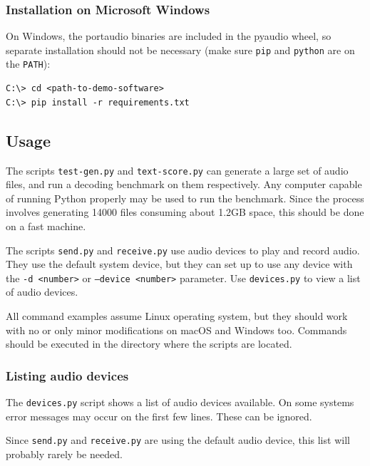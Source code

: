 \documentclass[a4paper]{article}
\begin{document}
\subsubsection{Installation on Microsoft Windows}

On Windows, the portaudio binaries are included in the pyaudio wheel, 
so separate installation should not be necessary (make sure 
\texttt{pip} and \texttt{python} are on the \texttt{PATH}):

\begin{lstlisting}
C:\> cd <path-to-demo-software>
C:\> pip install -r requirements.txt
\end{lstlisting}

\subsection{Usage}

The scripts \texttt{test-gen.py} and \texttt{text-score.py} can 
generate a large set of audio files, and run a decoding benchmark on 
them respectively. Any computer capable of running Python properly may 
be used to run the benchmark. Since the process involves generating
14000 files consuming about 1.2GB space, this should be done on a fast
machine.

The scripts \texttt{send.py} and \texttt{receive.py} use audio devices 
to play and record audio. They use the default system device, but they 
can set up to use any device with the \texttt{-d <number>} or 
\texttt{--device <number>} parameter. Use \texttt{devices.py} to view a 
list of audio devices.

All command examples assume Linux operating system, but they should 
work with no or only minor modifications on macOS and Windows too. 
Commands should be executed in the directory where the scripts are 
located.

\subsubsection{Listing audio devices}

The \texttt{devices.py} script shows a list of audio devices available. 
On some systems error messages may occur on the first few lines. These 
can be ignored.

Since \texttt{send.py} and \texttt{receive.py} are using the default 
audio device, this list will probably rarely be needed.

\newpage
\end{document}

